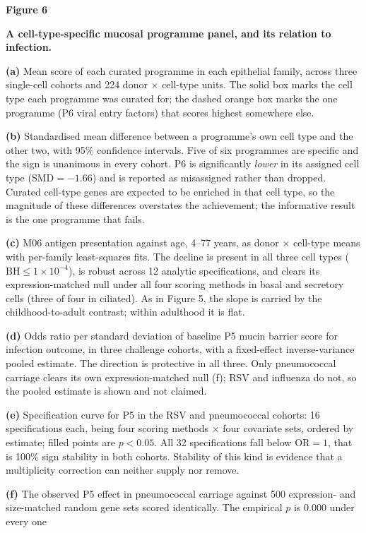 \documentclass[11pt,a4paper]{article}
\newcommand{\legend}[3]{%
  \clearpage
  {\large\textbf{Figure #1}\par}
  \vspace{2pt}
  {\textbf{#2}\par}
  \vspace{6pt}
  \small #3\par
}
\begin{document}
\legend{6}{A cell-type-specific mucosal programme panel, and its relation to infection.}{%
\textbf{(a)} Mean score of each curated programme in each epithelial family, across three
single-cell cohorts and 224 donor $\times$ cell-type units. The solid box marks the cell type
each programme was curated for; the dashed orange box marks the one programme (P6 viral entry
factors) that scores highest somewhere else.
\par
\textbf{(b)} Standardised mean difference between a programme's own cell type and the other
two, with 95\% confidence intervals. Five of six programmes are specific and the sign is
unanimous in every cohort. P6 is significantly \emph{lower} in its assigned cell type
($\mathrm{SMD}=-1.66$) and is reported as misassigned rather than dropped. Curated cell-type
genes are expected to be enriched in that cell type, so the magnitude of these differences
overstates the achievement; the informative result is the one programme that fails.
\par
\textbf{(c)} M06 antigen presentation against age, 4--77 years, as donor $\times$ cell-type
means with per-family least-squares fits. The decline is present in all three cell types
($\mathrm{BH}\le1\times10^{-4}$), is robust across 12 analytic specifications, and clears its
expression-matched null under all four scoring methods in basal and secretory cells (three of
four in ciliated). As in Figure 5, the slope is carried by the childhood-to-adult contrast;
within adulthood it is flat.
\par
\textbf{(d)} Odds ratio per standard deviation of baseline P5 mucin barrier score for
infection outcome, in three challenge cohorts, with a fixed-effect inverse-variance pooled
estimate. The direction is protective in all three. Only pneumococcal carriage clears its own
expression-matched null (f); RSV and influenza do not, so the pooled estimate is shown and
not claimed.
\par
\textbf{(e)} Specification curve for P5 in the RSV and pneumococcal cohorts: 16
specifications each, being four scoring methods $\times$ four covariate sets, ordered by
estimate; filled points are $p<0.05$. All 32 specifications fall below $\mathrm{OR}=1$, that
is 100\% sign stability in both cohorts. Stability of this kind is evidence that a
multiplicity correction can neither supply nor remove.
\par
\textbf{(f)} The observed P5 effect in pneumococcal carriage against 500 expression- and
size-matched random gene sets scored identically. The empirical $p$ is 0.000 under every one
}
\end{document}
